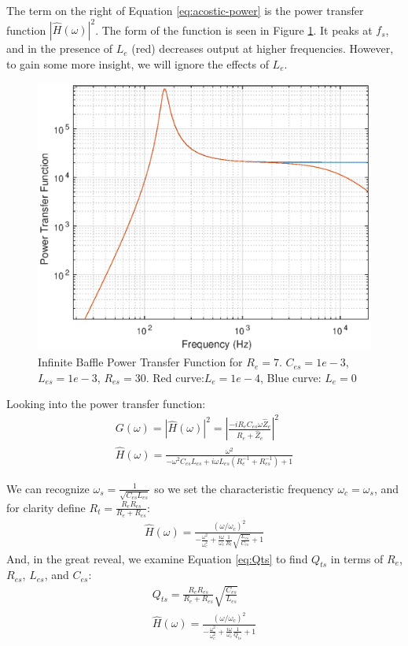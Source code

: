 \documentclass[10pt]{book}
\begin{document}
The term on the right of Equation \ref{eq:acostic-power} is the power transfer function $\left| \hat{H}(\omega)\right|^2$. The form of the function is seen in Figure \ref{fig:power-transfer}. It peaks at $f_s$, and in the presence of $L_e$ (red) decreases output at higher frequencies. However, to gain some more insight, we will ignore the effects of $L_e$.

\begin{figure}
\centering
\includegraphics[width=.75\textwidth]{matlab/infiniteBafflePower.eps}
\caption{Infinite Baffle Power Transfer Function for $R_e=7$.
$C_{es}=1e-3$, $L_{es}=1e-3$, $R_{es}=30$. Red curve:$L_e=1e-4$, Blue curve: $L_e=0$}\label{fig:power-transfer}
\end{figure}

Looking into the power transfer function:
\begin{align}
G(\omega)=\left| \hat{H}(\omega)\right|^2 =\left| \frac{-iR_{e}C_{es}\omega  \hat{Z}_e }{ R_e+\hat{Z}_e} \right|^2\\
\hat{H}(\omega) =\frac{\omega^2}{-\omega^2 C_{es}L_{es}+i\omega L_{es}\left( R_e^{-1}+R_{es}^{-1} \right) +1}
\end{align}

We can recognize $\omega_s=\frac{1}{\sqrt{C_{es} L_{es}}}$ so we set the characteristic frequency $\omega_c=\omega_s$, and for clarity define $R_t=\frac{R_eR_{es}}{R_e+R_{es}}$:
\begin{align}
\hat{H}(\omega) =\frac{(\omega/\omega_c)^2}{-\frac{\omega^2}{\omega_c^2} +\frac{i \omega}{\omega_c}\frac{1}{R_t}\sqrt{\frac{ L_{es}}{C_{es}}} +1}\label{eq:freeair-transfer}
\end{align}
And, in the great reveal, we examine Equation \ref{eq:Qts} to find $Q_{ts}$ in terms of $R_{e}$, $R_{es}$, $L_{es}$, and $C_{es}$:
\begin{align}
Q_{ts}=\frac{R_e R_{es}}{R_e+R_{es}}\sqrt{\frac{C_{es}}{L_{es}}}\\
\hat{H}(\omega) =\frac{(\omega/\omega_c)^2}{-\frac{\omega^2}{\omega_c^2} +\frac{i \omega}{\omega_c}\frac{1}{Q_{ts}}+1}\label{eq:general_transfer_function}
\end{align}
\end{document}
